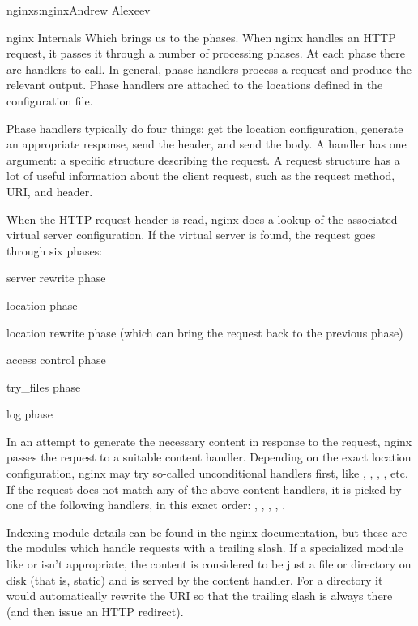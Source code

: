 \begin{aosachapter}{nginx}{s:nginx}{Andrew Alexeev}
\begin{aosasect1}{nginx Internals}
Which brings us to the phases. When nginx handles an HTTP request, it
passes it through a number of processing phases. At each phase there
are handlers to call. In general, phase handlers process a request and
produce the relevant output. Phase handlers are attached to the
locations defined in the configuration file.

Phase handlers typically do four things: get the location
configuration, generate an appropriate response, send the header, and
send the body. A handler has one argument: a specific structure
describing the request. A request structure has a lot of useful
information about the client request, such as the request method, URI,
and header.

When the HTTP request header is read, nginx does a lookup of the
associated virtual server configuration. If the virtual server is
found, the request goes through six phases:

\begin{aosaenumerate}

\item server rewrite phase

\item location phase

\item location rewrite phase (which can bring the request back to the
previous phase)

\item access control phase

\item try\_files phase

\item log phase

\end{aosaenumerate}

In an attempt to generate the necessary content in response to the
request, nginx passes the request to a suitable content
handler. Depending on the exact location configuration, nginx may try
so-called unconditional handlers first, like ,
, , , etc. If the request does
not match any of the above content handlers, it is picked by one of
the following handlers, in this exact order: ,
, , , .

Indexing module details can be found in the nginx documentation, but
these are the modules which handle requests with a trailing slash. If
a specialized module like  or  isn't
appropriate, the content is considered to be just a file or directory
on disk (that is, static) and is served by the  content
handler. For a directory it would automatically rewrite the URI so
that the trailing slash is always there (and then issue an HTTP
redirect).


\end{aosasect1}
\end{aosachapter}
